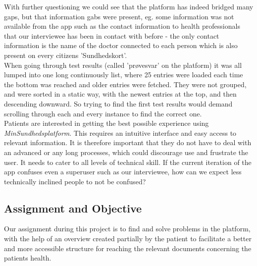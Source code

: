 \documentclass[a4paper,11pt]{article}
\begin{document}
With further questioning we could see that the platform has indeed bridged many gaps, but that information gabs were present, eg. some information was not available from the app such as the contact information to health professionals that our interviewee has been in contact with before - the only contact information is the name of the doctor connected to each person which is also present on every citizens 'Sundhedskort'.\\

When going through test results (called 'prøvesvar' on the platform) it was all lumped into one long continuously list, where 25 entries were loaded each time the bottom was reached and older entries were fetched. They were not grouped, and were sorted in a static way, with the newest entries at the top, and then descending downward. So trying to find the first test results would demand scrolling through each and every instance to find the correct one.\\

Patients are interested in getting the best possible experience using \textit{MinSundhedsplatform}. This requires an intuitive interface and easy access to relevant information. It is therefore important that they do not have to deal with an advanced or any long processes, which could discourage use and frustrate the user. It needs to cater to all levels of technical skill. If the current iteration of the app confuses even a superuser such as our interviewee, how can we expect less technically inclined people to not be confused?




\subsection{Assignment and Objective}
Our assignment during this project is to find and solve problems in the platform, with the help of an overview created partially by the patient to facilitate a better and more accessible structure for reaching the relevant documents concerning the patients health.
\end{document}

